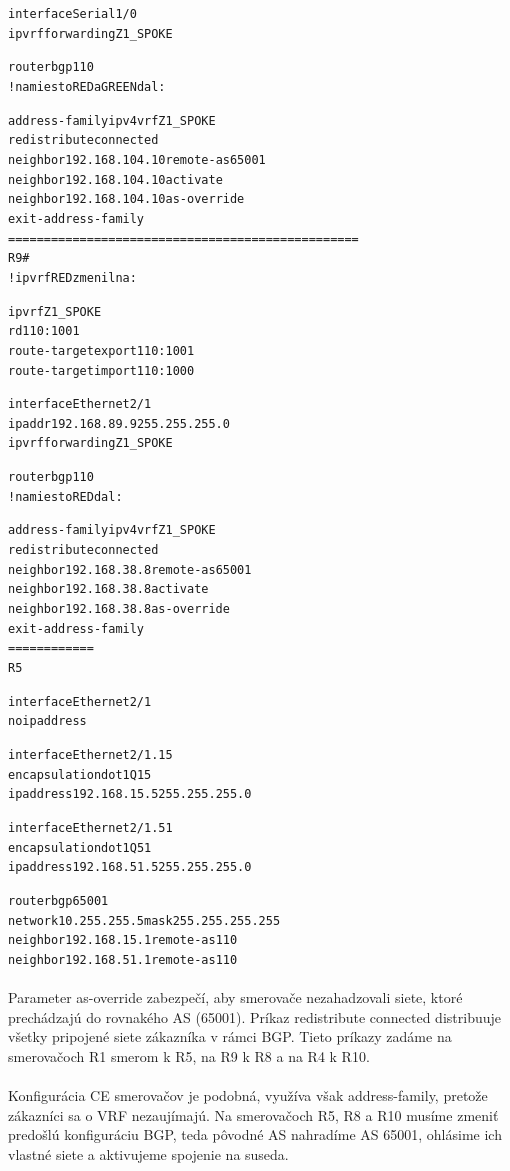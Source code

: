\documentclass[12pt,twoside,a4paper]{report}
\begin{document}
{\begin{small}
\begin{alltt}
interface Serial1/0
 ip vrf forwarding Z1_SPOKE

router bgp 110
!namiesto RED a GREEN dal:

 address-family ipv4 vrf Z1_SPOKE
  redistribute connected
  neighbor 192.168.104.10 remote-as 65001
  neighbor 192.168.104.10 activate
  neighbor 192.168.104.10 as-override
 exit-address-family
=================================================
R9#
!ip vrf RED zmenil na:

ip vrf Z1_SPOKE
 rd 110:1001
 route-target export 110:1001
 route-target import 110:1000

interface Ethernet2/1
 ip addr 192.168.89.9 255.255.255.0
 ip vrf forwarding Z1_SPOKE

router bgp 110
!namiesto RED dal:

 address-family ipv4 vrf Z1_SPOKE
  redistribute connected
  neighbor 192.168.38.8 remote-as 65001
  neighbor 192.168.38.8 activate
  neighbor 192.168.38.8 as-override
 exit-address-family
============
R5

interface Ethernet2/1
 no ip address

interface Ethernet2/1.15
 encapsulation dot1Q 15
 ip address 192.168.15.5 255.255.255.0

interface Ethernet2/1.51
 encapsulation dot1Q 51
 ip address 192.168.51.5 255.255.255.0

router bgp 65001
 network 10.255.255.5 mask 255.255.255.255
 neighbor 192.168.15.1 remote-as 110
 neighbor 192.168.51.1 remote-as 110
\end{alltt}
\end{small}
}

\paragraph{}
Parameter as-override zabezpečí, aby smerovače nezahadzovali siete, ktoré prechádzajú do rovnakého AS (65001). Príkaz redistribute connected distribuuje všetky pripojené siete zákazníka v rámci BGP. Tieto príkazy zadáme na smerovačoch R1 smerom k R5, na R9 k R8 a na R4 k R10.

\paragraph{}
Konfigurácia CE smerovačov je podobná, využíva však address-family, pretože zákazníci sa o VRF nezaujímajú. Na smerovačoch R5, R8 a R10 musíme zmeniť predošlú konfiguráciu BGP, teda pôvodné AS nahradíme AS 65001, ohlásime ich vlastné siete a aktivujeme spojenie na suseda.
\end{document}
